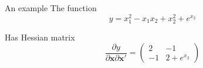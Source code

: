 \documentclass[10pt]{beamer}
\begin{document}
                                       \begin{frame}{An example}
                                         The function
                                         \begin{equation}
                                           y=x_1^2-x_1x_2+x_2^2+e^{x_2}
                                         \end{equation}

                                         Has Hessian matrix
                                         \begin{equation}
                                           \frac{\partial y}{\partial{\bm x}\partial{\bm x}'}=\left(\begin{array}{cc}
                                                                                                      2 & -1\\
                                                                                                      -1 & 2 + e^{x_2}
                                                                                                    \end{array}
                                                                                                  \right)
                                                                                                \end{equation}
                                                                                              \end{frame}
\end{document}
